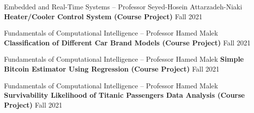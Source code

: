   \begin{cventries}
    
    
    \cventry
    {Embedded and Real-Time Systems -- Professor Seyed-Hosein Attarzadeh-Niaki}
    {\textbf {Heater/Cooler Control System (Course Project)}}
    {}
    {Fall 2021}
    {}
    \vspace{0.0 cm}
  \end{cventries}
  \begin{cventries}
    
      \cventry
    {Fundamentals of Computational Intelligence -- Professor Hamed Malek}
    {\textbf {Classification of Different Car Brand Models (Course Project)}}
    {}
    {Fall 2021}
    {}
    \vspace{0.0 cm}
  \end{cventries}
  \begin{cventries}
	
	    \cventry
    {Fundamentals of Computational Intelligence -- Professor Hamed Malek}
    {\textbf {Simple Bitcoin Estimator Using Regression (Course Project)}}
    {}
    {Fall 2021}
    {}
    \vspace{0.0 cm}
  \end{cventries}
  \begin{cventries}

      \cventry
    {Fundamentals of Computational Intelligence -- Professor Hamed Malek}
    {\textbf {Survivability Likelihood of Titanic Passengers Data Analysis (Course Project)}}
    {}
    {Fall 2021}
    {}
    \vspace{0.0 cm}
  \end{cventries}
